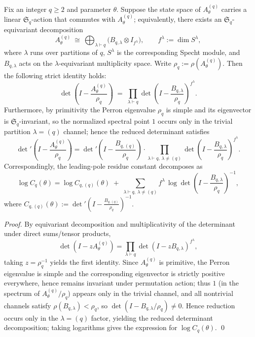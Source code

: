 \begin{proposition}\label{prop:finite-part-reduced-determinant-sq-channel-factorization}
Fix an integer \(q\ge 2\) and parameter \(\theta\).
Suppose the state space of \(A^{(q)}_\theta\) carries a linear \(\mathfrak{S}_q\)-action that commutes with \(A^{(q)}_\theta\); equivalently, there exists an \(\mathfrak{S}_q\)-equivariant decomposition
\[
A^{(q)}_\theta\ \cong\ \bigoplus_{\lambda\vdash q}\bigl(B_{q,\lambda}\otimes I_{f^\lambda}\bigr),
\qquad f^\lambda:=\dim S^\lambda,
\]
where \(\lambda\) runs over partitions of \(q\), \(S^\lambda\) is the corresponding Specht module, and \(B_{q,\lambda}\) acts on the \(\lambda\)-equivariant multiplicity space.
Write \(\rho_q:=\rho(A^{(q)}_\theta)\).
Then the following strict identity holds:
\[
\det\!\left(I-\frac{A^{(q)}_\theta}{\rho_q}\right)
\;=\;
\prod_{\lambda\vdash q}\det\!\left(I-\frac{B_{q,\lambda}}{\rho_q}\right)^{f^\lambda}.
\]
Furthermore, by primitivity the Perron eigenvalue \(\rho_q\) is simple and its eigenvector is \(\mathfrak{S}_q\)-invariant,
so the normalized spectral point \(1\) occurs only in the trivial partition \(\lambda=(q)\) channel; hence the reduced determinant satisfies
\[
\det\nolimits'\!\left(I-\frac{A^{(q)}_\theta}{\rho_q}\right)
=
\det\nolimits'\!\left(I-\frac{B_{q,(q)}}{\rho_q}\right)\cdot
\prod_{\lambda\vdash q,\ \lambda\neq(q)}
\det\!\left(I-\frac{B_{q,\lambda}}{\rho_q}\right)^{f^\lambda}.
\]
Correspondingly, the leading-pole residue constant decomposes as
\[
\log C_q(\theta)
=
\log C_{q,(q)}(\theta)
\;+\;
\sum_{\lambda\vdash q,\ \lambda\neq(q)}
f^\lambda\,\log\det\!\left(I-\frac{B_{q,\lambda}}{\rho_q}\right)^{-1},
\]
where
\(
C_{q,(q)}(\theta):=\det\nolimits'\!\left(I-\frac{B_{q,(q)}}{\rho_q}\right)^{-1}
\).
\end{proposition}
\begin{proof}
By equivariant decomposition and multiplicativity of the determinant under direct sums/tensor products,
\[
\det(I-zA^{(q)}_\theta)=\prod_{\lambda\vdash q}\det(I-zB_{q,\lambda})^{f^\lambda},
\]
taking \(z=\rho_q^{-1}\) yields the first identity.
Since \(A^{(q)}_\theta\) is primitive, the Perron eigenvalue is simple and the corresponding eigenvector is strictly positive everywhere, hence remains invariant under permutation action;
thus \(1\) (in the spectrum of \(A^{(q)}_\theta/\rho_q\)) appears only in the trivial channel, and all nontrivial channels satisfy \(\rho(B_{q,\lambda})<\rho_q\), so \(\det(I-B_{q,\lambda}/\rho_q)\neq 0\).
Hence reduction occurs only in the \(\lambda=(q)\) factor, yielding the reduced determinant decomposition; taking logarithms gives the expression for \(\log C_q(\theta)\). \qed
\end{proof}


